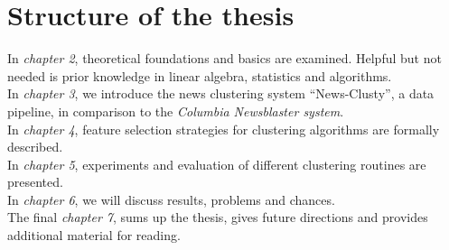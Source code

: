 \section{Structure of the thesis}
  In \emph{chapter 2}, theoretical foundations and basics are examined. Helpful but not needed is prior knowledge in linear algebra, statistics and algorithms.\\
  In \emph{chapter 3}, we introduce the news clustering system ``News-Clusty'', a data pipeline, in comparison to the \emph{Columbia Newsblaster system}.\\
  In \emph{chapter 4}, feature selection strategies for clustering algorithms are formally described.\\
  In \emph{chapter 5}, experiments and evaluation of different clustering routines are presented.\\
  In \emph{chapter 6}, we will discuss results, problems and chances.\\
  The final \emph{chapter 7}, sums up the thesis, gives future directions and provides additional material for reading.

